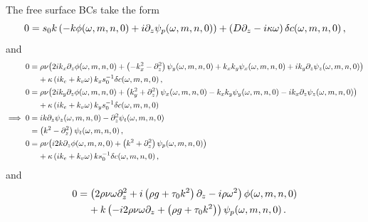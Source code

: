 \documentclass[reqno]{amsart}
\numberwithin{equation}{section}
\numberwithin{figure}{section}
\begin{document}
The free surface BCs take the form
\begin{equation*}
0 = s_{0}k\left(-k\phi\!\left(\omega,m,n,0\right)+i\partial_{z}\psi_{p}\!\left(\omega,m,n,0\right)\right)+\left(D\partial_{z}-i\kappa\omega\right)\delta c\!\left(\omega,m,n,0\right),
\end{equation*}
and
\begin{align*}
0
  &= \sDensity\kinematicViscousity\!\left(2ik_{x}\partial_{z}\vPotential\!\left(\omega,m,n,0\right)+\left(-k_{x}^{2}-\partial_{z}^{2}\right)\vStream_{y}\!\left(\omega,m,n,0\right)+k_{x}k_{y}\vStream_{x}\!\left(\omega,m,n,0\right)+ik_{y}\partial_{z}\vStream_{z}\!\left(\omega,m,n,0\right)\right) \\
  &\phantom{=}\,\,+\kappa\left(ik_{e}+k_{v}\omega\right)k_{x}\sSurfCo_{0}^{-1}\delta\sBulkCo\!\left(\omega,m,n,0\right), \\
0
  &= \sDensity\kinematicViscousity\!\left(2ik_{y}\partial_{z}\vPotential\!\left(\omega,m,n,0\right)+\left(k_{y}^{2}+\partial_{z}^{2}\right)\vStream_{x}\!\left(\omega,m,n,0\right)-k_{x}k_{y}\vStream_{y}\!\left(\omega,m,n,0\right)-ik_{x}\partial_{z}\vStream_{z}\!\left(\omega,m,n,0\right)\right) \\
  &\phantom{=}\,\,+\kappa\left(ik_{e}+k_{v}\omega\right)k_{y}\sSurfCo_{0}^{-1}\delta\sBulkCo\!\left(\omega,m,n,0\right) \\
\implies
0 &= ik\partial_{z}\vStream_{z}\!\left(\omega,m,n,0\right)-\partial_{z}^{2}\vStream_{t}\!\left(\omega,m,n,0\right) \\
  &= \left(k^{2}-\partial_{z}^{2}\right)\vStream_{t}\!\left(\omega,m,n,0\right), \\
0
  &= \sDensity\kinematicViscousity\!\left(i2k\partial_{z}\vPotential\!\left(\omega,m,n,0\right)+\left(k^{2}+\partial_{z}^{2}\right)\vStream_{p}\!\left(\omega,m,n,0\right)\right) \\
  &\phantom{=}\,\,+\kappa\left(ik_{e}+k_{v}\omega\right)k\sSurfCo_{0}^{-1}\delta\sBulkCo\!\left(\omega,m,n,0\right),
\end{align*}
and
\begin{align*}
0
  &= \left(2\rho\nu\omega\partial_{z}^{2}+i\left(\rho g+\tau_{0}k^{2}\right)\partial_{z}-i\rho\omega^{2}\right)\phi\!\left(\omega,m,n,0\right) \\
  &\phantom{=}\,\,+k\left(-i2\rho\nu\omega\partial_{z}+\left(\rho g+\tau_{0}k^{2}\right)\right)\psi_{p}\!\left(\omega,m,n,0\right).
\end{align*}
\end{document}
